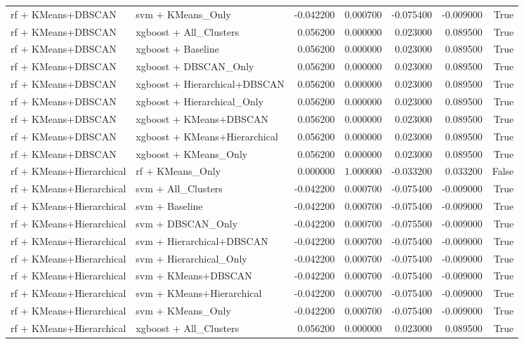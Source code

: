 \begin{tabular}{llrrrrr}
rf + KMeans+DBSCAN & svm + KMeans_Only & -0.042200 & 0.000700 & -0.075400 & -0.009000 & True \\
rf + KMeans+DBSCAN & xgboost + All_Clusters & 0.056200 & 0.000000 & 0.023000 & 0.089500 & True \\
rf + KMeans+DBSCAN & xgboost + Baseline & 0.056200 & 0.000000 & 0.023000 & 0.089500 & True \\
rf + KMeans+DBSCAN & xgboost + DBSCAN_Only & 0.056200 & 0.000000 & 0.023000 & 0.089500 & True \\
rf + KMeans+DBSCAN & xgboost + Hierarchical+DBSCAN & 0.056200 & 0.000000 & 0.023000 & 0.089500 & True \\
rf + KMeans+DBSCAN & xgboost + Hierarchical_Only & 0.056200 & 0.000000 & 0.023000 & 0.089500 & True \\
rf + KMeans+DBSCAN & xgboost + KMeans+DBSCAN & 0.056200 & 0.000000 & 0.023000 & 0.089500 & True \\
rf + KMeans+DBSCAN & xgboost + KMeans+Hierarchical & 0.056200 & 0.000000 & 0.023000 & 0.089500 & True \\
rf + KMeans+DBSCAN & xgboost + KMeans_Only & 0.056200 & 0.000000 & 0.023000 & 0.089500 & True \\
rf + KMeans+Hierarchical & rf + KMeans_Only & 0.000000 & 1.000000 & -0.033200 & 0.033200 & False \\
rf + KMeans+Hierarchical & svm + All_Clusters & -0.042200 & 0.000700 & -0.075400 & -0.009000 & True \\
rf + KMeans+Hierarchical & svm + Baseline & -0.042200 & 0.000700 & -0.075400 & -0.009000 & True \\
rf + KMeans+Hierarchical & svm + DBSCAN_Only & -0.042200 & 0.000700 & -0.075500 & -0.009000 & True \\
rf + KMeans+Hierarchical & svm + Hierarchical+DBSCAN & -0.042200 & 0.000700 & -0.075400 & -0.009000 & True \\
rf + KMeans+Hierarchical & svm + Hierarchical_Only & -0.042200 & 0.000700 & -0.075400 & -0.009000 & True \\
rf + KMeans+Hierarchical & svm + KMeans+DBSCAN & -0.042200 & 0.000700 & -0.075400 & -0.009000 & True \\
rf + KMeans+Hierarchical & svm + KMeans+Hierarchical & -0.042200 & 0.000700 & -0.075400 & -0.009000 & True \\
rf + KMeans+Hierarchical & svm + KMeans_Only & -0.042200 & 0.000700 & -0.075400 & -0.009000 & True \\
rf + KMeans+Hierarchical & xgboost + All_Clusters & 0.056200 & 0.000000 & 0.023000 & 0.089500 & True \\

\end{tabular}
